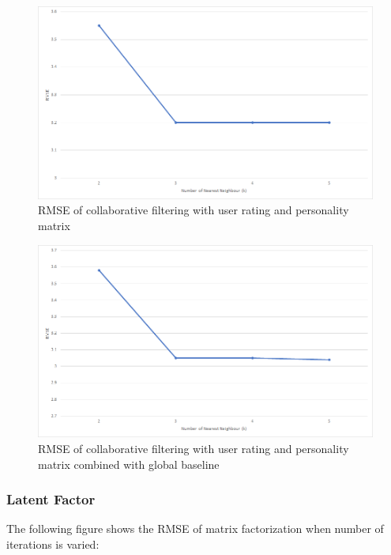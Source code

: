 \begin{figure}[h]
  \centering
    \includegraphics[width=1\textwidth]{fig/rmse_cf_average.png}
    \caption{RMSE of collaborative filtering with user rating and personality matrix}
\end{figure}

\begin{figure}[h]
  \centering
    \includegraphics[width=1\textwidth]{fig/rmse_cf_combined_average.png}
    \caption{RMSE of collaborative filtering with user rating and personality matrix combined with global baseline}
\end{figure}


\subsubsection{Latent Factor}
The following figure shows the RMSE of matrix factorization when number of iterations is varied:

\cleardoublepage

